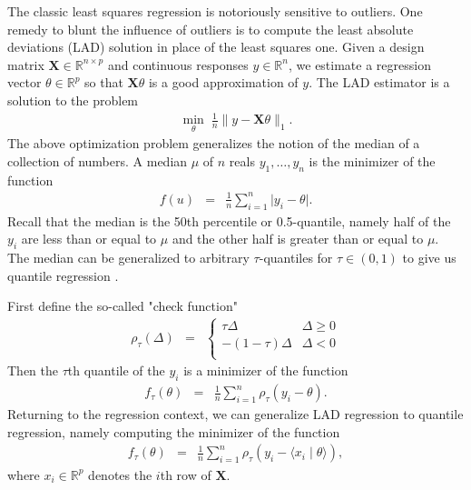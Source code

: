 \documentclass[12pt]{article}
\begin{document}
	The classic least squares regression is notoriously sensitive to outliers. One remedy to blunt the influence of outliers is to compute the least absolute deviations (LAD) solution in place of the least squares one. Given a design matrix $\mathbf{X} \in \mathbb{R}^{n \times p}$ and continuous responses $y \in \mathbb{R}^n$, we estimate a regression vector $\theta \in \mathbb{R}^p$ so that $\mathbf{X}\theta$ is a good approximation of $y$. The LAD estimator is a solution to the problem
	\begin{eqnarray}
		\underset{\theta}{\min}\; \frac{1}{n}\lVert y - \mathbf{X}\theta \rVert_1.
	\end{eqnarray}
	The above optimization problem generalizes the notion of the median of a collection of numbers. A median $\mu$ of $n$ reals $y_1, \ldots, y_n$ is the minimizer of the function
	\begin{eqnarray}
		f(u) & = & \frac{1}{n}\sum_{i=1}^n \lvert y_i - \theta \rvert.
	\end{eqnarray}
	Recall that the median is the 50th percentile or 0.5-quantile, namely half of the $y_i$ are less than or equal to $\mu$ and the other half is greater than or equal to $\mu$. The median can be generalized to arbitrary $\tau$-quantiles for $\tau \in (0,1)$ to give us quantile regression \citep{Koenker1978}.
	
	First define the so-called "check function"
	\begin{eqnarray}
		\rho_\tau(\Delta) & = & \begin{cases}
			\tau \Delta & \Delta \geq 0 \\
			-(1-\tau)\Delta & \Delta < 0 \\
		\end{cases}
	\end{eqnarray}
	Then the $\tau$th quantile of the $y_i$ is a minimizer of the function
	\begin{eqnarray}
		f_\tau(\theta) & = & \frac{1}{n}\sum_{i=1}^n \rho_\tau(y_i - \theta).
	\end{eqnarray}
	Returning to the regression context, we can generalize LAD regression to quantile regression, namely computing the minimizer of the function
	\begin{eqnarray}
		f_\tau(\theta) & = & \frac{1}{n}\sum_{i=1}^n \rho_\tau(y_i - \langle x_i \mid \theta \rangle),
	\end{eqnarray}
	where $x_i \in \mathbb{R}^p$ denotes the $i$th row of $\mathbf{X}$.
	
\end{document}
